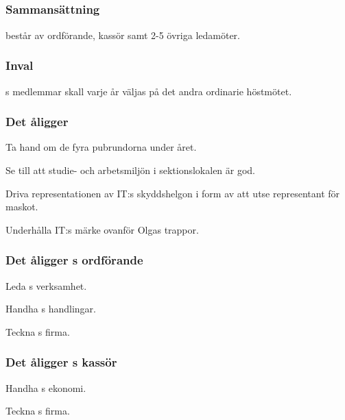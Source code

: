 \subsection{\PRITFULL}
\subsubsection{Sammansättning}
\PRIT{} består av ordförande, kassör samt 2-5 övriga ledamöter.

\subsubsection{Inval}
\PRIT{}s medlemmar skall varje år väljas på det andra ordinarie höstmötet.

\subsubsection{Det åligger \PRIT}
\begin{att}
	\item Ta hand om de fyra pubrundorna under året.
	\item Se till att studie- och arbetsmiljön i sektionslokalen är god.
	\item Driva representationen av IT:s skyddshelgon i form av att utse representant för maskot.
	\item Underhålla IT:s märke ovanför Olgas trappor.
\end{att}

\subsubsection{Det åligger \PRIT{}s ordförande}
\begin{att}
	\item Leda \PRIT{}s verksamhet.
	\item Handha \PRIT{}s handlingar.
	\item Teckna \PRIT{}s firma.
\end{att}

\subsubsection{Det åligger \PRIT{}s kassör}
\begin{att}
	\item Handha \PRIT{}s ekonomi.
	\item Teckna \PRIT{}s firma.
\end{att}
